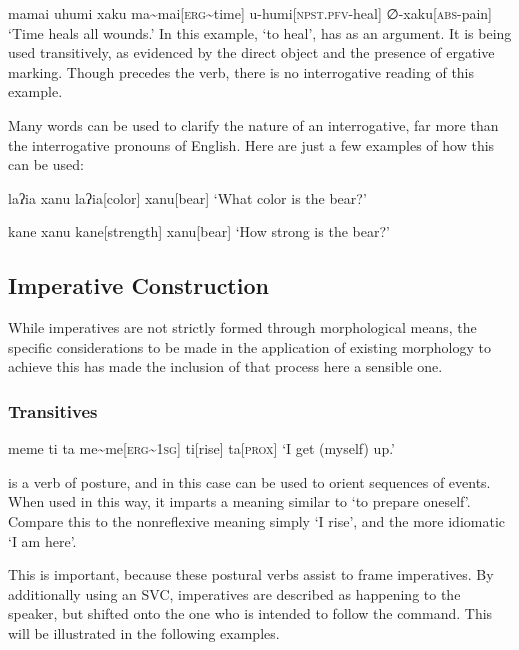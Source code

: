 \ex
\begingl
\glpreamble mamai uhumi xaku
\endpreamble
ma\textasciitilde mai[\textsc{erg\textasciitilde}time]
u-humi[\textsc{npst.pfv-}heal]
∅-xaku[\textsc{abs-}pain]
\glft `Time heals all wounds.'
\endgl
\xe
In this example,  `to heal', has  as an argument.
It is being used transitively, as evidenced by the direct object  and the presence of ergative marking.
Though  precedes the verb, there is no interrogative reading of this example.

Many words can be used to clarify the nature of an interrogative, far more than the interrogative pronouns of English.
Here are just a few examples of how this can be used:

\begin{paracol}{2}
\ex
\begingl
\glpreamble laʔia xanu
\endpreamble
laʔia[color]
xanu[bear]
\glft `What color is the bear?'
\endgl
\xe
\switchcolumn

\ex
\begingl
\glpreamble kane xanu
\endpreamble
kane[strength]
xanu[bear]
\glft `How strong is the bear?'
\endgl
\xe
\end{paracol}

\subsection{Imperative Construction}

While imperatives are not strictly formed through morphological means, the specific considerations to be made in the application of existing morphology to achieve this has made the inclusion of that process here a sensible one.

\subsubsection{Transitives}
\ex
\begingl
\glpreamble meme ti ta
\endpreamble
me\textasciitilde me[\textsc{erg\textasciitilde1sg}]
ti[rise]
ta[\textsc{prox}]
\glft `I get (myself) up.'
\endgl
\xe

 is a verb of posture, and in this case can be used to orient sequences of events.
When used in this way, it imparts a meaning similar to `to prepare oneself'.
Compare this to the nonreflexive meaning simply `I rise', and the more idiomatic `I am here'.

This is important, because these postural verbs assist to frame imperatives.
By additionally using an SVC, imperatives are described as happening to the speaker, but shifted onto the one who is intended to follow the command.
This will be illustrated in the following examples.

